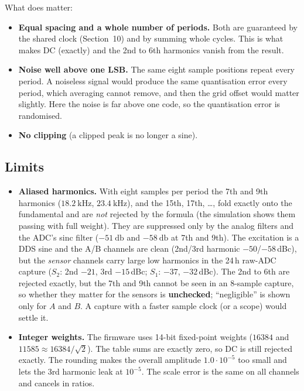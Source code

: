\documentclass[11pt,a4paper]{article}
\begin{document}
What does matter:
\begin{itemize}
  \item \textbf{Equal spacing and a whole number of periods.}  Both are
        guaranteed by the shared clock (Section~10) and by summing whole
        cycles.  This is what makes DC (exactly) and the 2nd to 6th
        harmonics vanish from the result.
  \item \textbf{Noise well above one LSB.}  The same eight sample positions
        repeat every period.  A noiseless signal would produce the same
        quantisation error every period, which averaging cannot remove, and
        then the grid offset would matter slightly.  Here the noise is far
        above one code, so the quantisation error is randomised.
  \item \textbf{No clipping} (a clipped peak is no longer a sine).
\end{itemize}

\subsection{Limits}

\begin{itemize}
  \item \textbf{Aliased harmonics.}  With eight samples per period the 7th
        and 9th harmonics ($\SI{18.2}{\kilo\hertz}$, $\SI{23.4}{\kilo\hertz}$),
        and the 15th, 17th, \dots, fold exactly onto the fundamental and are
        \emph{not} rejected by the formula (the simulation shows them passing
        with full weight).  They are suppressed only by the analog filters
        and the ADC's sinc filter ($\SI{-51}{\decibel}$ and
        $\SI{-58}{\decibel}$ at 7th and 9th).  The excitation is a DDS sine
        and the A/B channels are clean (2nd/3rd harmonic $-50$/$-58$\,dBc),
        but the \emph{sensor} channels carry large low harmonics in the 24\,h
        raw-ADC capture ($S_2$: 2nd $-21$, 3rd $-15$\,dBc; $S_1$: $-37$, $-32$\,dBc).
        The 2nd to 6th are rejected exactly, but the 7th and 9th cannot be seen
        in an 8-sample capture, so whether they matter for the sensors is
        \textbf{unchecked}; ``negligible'' is shown only for $A$ and $B$.  A
        capture with a faster sample clock (or a scope) would settle it.
  \item \textbf{Integer weights.}  The firmware uses 14-bit fixed-point
        weights ($16384$ and $11585\approx16384/\sqrt{2}$).  The table
        sums are exactly zero, so DC is still rejected exactly.  The rounding
        makes the overall amplitude $1.0\cdot10^{-5}$ too small and lets the
        3rd harmonic leak at $10^{-5}$.  The scale error is the same on all
        channels and cancels in ratios.
\end{itemize}
\end{document}
